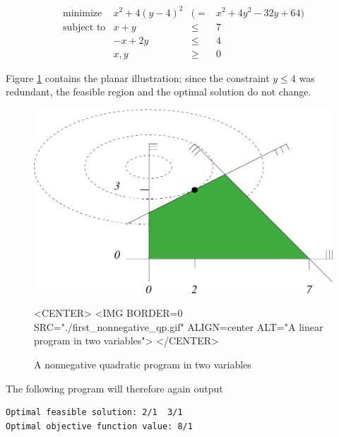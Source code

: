 \[
\begin{array}{lrcl}
\mbox{minimize}       & x^2 + 4(y-4)^2 &(=& x^2 + 4y^2 - 32y + 64) \\
\mbox{subject to}     & x + y &\leq& 7 \\
                      & -x + 2y &\leq& 4 \\
                      & x,y &\geq& 0
\end{array}
\]

Figure \ref{fig:QP-first_nonnegative_qp} contains 
the planar illustration; since the constraint $y\leq 4$ was 
redundant, the feasible region and the optimal solution do 
not change. 

\begin{figure}[htbp]
\begin{ccTexOnly}
\begin{center}
\includegraphics{QP_solver/first_nonnegative_qp} 
\end{center}
\end{ccTexOnly}
\caption{A nonnegative quadratic program in two variables
\label{fig:QP-first_nonnegative_qp}}

\begin{ccHtmlOnly}
<CENTER>
<IMG BORDER=0 SRC="./first_nonnegative_qp.gif" ALIGN=center ALT="A linear program in two variables">
</CENTER>
\end{ccHtmlOnly}
\end{figure}

The following program will therefore again output
\begin{verbatim}
Optimal feasible solution: 2/1  3/1
Optimal objective function value: 8/1
\end{verbatim}


